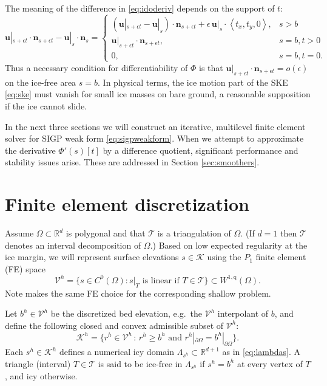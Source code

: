 \documentclass[letterpaper,final,12pt,reqno]{amsart}
\theoremstyle{claim}
\newcommand{\eps}{\epsilon}
\newcommand{\RR}{\mathbb{R}}
\newcommand{\bn}{\mathbf{n}}
\newcommand{\bu}{\mathbf{u}}
\newcommand{\qq}{{\text{q}}}
\newcommand{\bus}{\bu|_s}
\numberwithin{equation}{section}
\numberwithin{figure}{section}
\numberwithin{table}{section}
\numberwithin{theorem}{section}
\begin{document}
The meaning of the difference in \eqref{eq:idoderiv} depends on the support of $t$:
\begin{equation}
\bu|_{s+\eps t} \cdot \bn_{s+\eps t} - \bus \cdot \bn_s = \begin{cases}
           (\bu|_{s+\eps t} - \bus) \cdot \bn_{s+\eps t} + \eps\, \bus \cdot \left<t_x,t_y,0\right>, & s > b \\
           \bu|_{s+\eps t} \cdot \bn_{s+\eps t}, & s=b, t > 0 \\
           0, & s=b, t = 0.
                 \end{cases} \label{eq:differencecases}
\end{equation}
Thus a necessary condition for differentiability of $\Phi$ is that $\bu|_{s+\eps t} \cdot \bn_{s+\eps t} = o(\eps)$ on the ice-free area $s=b$.  In physical terms, the ice motion part of the SKE \eqref{eq:ske} must vanish for small ice masses on bare ground, a reasonable supposition if the ice cannot slide.

In the next three sections we will construct an iterative, multilevel finite element solver for SIGP weak form \eqref{eq:sigpweakform}.  When we attempt to approximate the derivative $\Phi'(s)[t]$ by a difference quotient, significant performance and stability issues arise.  These are addressed in Section \ref{sec:smoothers}.


\section{Finite element discretization} \label{sec:fe}

Assume $\Omega \subset \RR^d$ is polygonal and that $\mathcal{T}$ is a triangulation of $\Omega$.  (If $d=1$ then $\mathcal{T}$ denotes an interval decomposition of $\Omega$.)  Based on low expected regularity at the ice margin, we will represent surface elevations $s\in \mathcal{K}$ using the $P_1$ finite element (FE) space
\begin{equation}
\mathcal{V}^h = \{s \in C^0(\Omega) : s|_T \text{ is linear if } T \in \mathcal{T}\} \subset W^{1,\qq}(\Omega).
\end{equation}
Note \cite{JouvetBueler2012} makes the same FE choice for the corresponding shallow problem.

Let $b^h \in \mathcal{V}^h$ be the discretized bed elevation, e.g.~the $\mathcal{V}^h$ interpolant of $b$, and define the following closed and convex admissible subset of $\mathcal{V}^h$:
\begin{equation}
\mathcal{K}^h = \{r^h \in \mathcal{V}^h \,:\, r^h \ge b^h \text{ and } r^h|_{\partial\Omega} = b^h|_{\partial\Omega}\}.  \label{eq:feK}
\end{equation}
Each $s^h\in \mathcal{K}^h$ defines a numerical icy domain $\Lambda_{s^h} \subset \RR^{d+1}$ as in \eqref{eq:lambdas}.  A triangle (interval) $T\in\mathcal{T}$ is said to be ice-free in $\Lambda_{s^h}$ if $s^h=b^h$ at every vertex of $T$, and icy otherwise.
\end{document}
